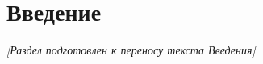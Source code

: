 
\chapter*{Введение}
\label{ch:introduction}

\textit{[Раздел подготовлен к переносу текста Введения]}
